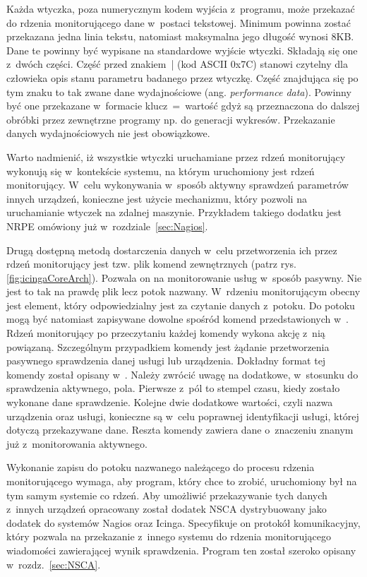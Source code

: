 Każda wtyczka, poza numerycznym kodem wyjścia z~programu, może
przekazać do rdzenia monitorującego dane w~postaci tekstowej. Minimum
powinna zostać przekazana jedna linia tekstu, natomiast maksymalna
jego długość wynosi 8KB. Dane te powinny być wypisane na standardowe
wyjście wtyczki. Składają się one z~dwóch części. Część przed
znakiem~| (kod ASCII 0x7C) stanowi czytelny dla człowieka opis stanu parametru badanego
przez wtyczkę. Część znajdująca się po tym znaku to tak zwane dane
wydajnościowe (ang. {\em performance data}). Powinny być one
przekazane w~formacie klucz~=~wartość gdyż są przeznaczona do dalszej
obróbki przez zewnętrzne programy np. do generacji
wykresów. Przekazanie danych wydajnościowych nie jest obowiązkowe.

Warto nadmienić, iż wszystkie wtyczki uruchamiane przez rdzeń
monitorujący wykonują się w~kontekście systemu, na którym uruchomiony
jest rdzeń monitorujący. W~celu wykonywania w~sposób aktywny sprawdzeń
parametrów innych urządzeń, konieczne jest użycie mechanizmu, który
pozwoli na uruchamianie wtyczek na zdalnej maszynie. Przykładem
takiego dodatku jest NRPE omówiony już w~rozdziale~\ref{sec:Nagios}.

Drugą dostępną metodą dostarczenia danych w~celu przetworzenia ich
przez rdzeń monitorujący jest tzw. plik komend zewnętrznych (patrz
rys.\ref{fig:icingaCoreArch}). Pozwala on na monitorowanie usług
w~sposób pasywny. Nie jest to tak na prawdę plik lecz potok
nazwany. W~rdzeniu monitorującym obecny jest element, który
odpowiedzialny jest za czytanie danych z~potoku. Do potoku mogą być
natomiast zapisywane dowolne spośród komend przedstawionych
w~\cite[412-436]{www:IcingaDoc}. Rdzeń monitorujący po przeczytaniu
każdej komendy wykona akcję z~nią powiązaną. Szczególnym przypadkiem
komendy jest żądanie przetworzenia pasywnego sprawdzenia danej usługi
lub urządzenia. Dokładny format tej komendy został opisany
w~\cite[296-299]{www:IcingaDoc}. Należy zwrócić uwagę na dodatkowe,
w~stosunku do sprawdzenia aktywnego, pola. Pierwsze z~pól to stempel
czasu, kiedy zostało wykonane dane sprawdzenie. Kolejne dwie dodatkowe
wartości, czyli nazwa urządzenia oraz usługi, konieczne są w~celu
poprawnej identyfikacji usługi, której dotyczą przekazywane
dane. Reszta komendy zawiera dane o~znaczeniu znanym już
z~monitorowania aktywnego.

Wykonanie zapisu do potoku nazwanego należącego do procesu rdzenia
monitorującego wymaga, aby program, który chce to zrobić, uruchomiony
był na tym samym systemie co rdzeń. Aby umożliwić przekazywanie tych
danych z~innych urządzeń opracowany został dodatek NSCA dystrybuowany
jako dodatek do systemów Nagios oraz Icinga. Specyfikuje on protokół
komunikacyjny, który pozwala na przekazanie z~innego systemu do
rdzenia monitorującego wiadomości zawierającej wynik
sprawdzenia. Program ten został szeroko opisany
w~rozdz.~\ref{sec:NSCA}.


